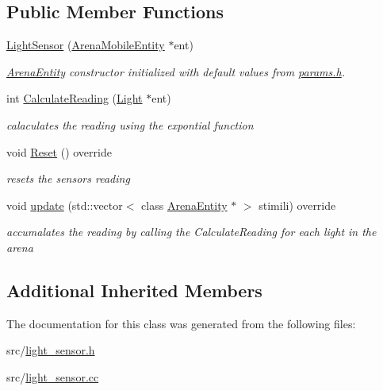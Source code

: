 \subsection*{Public Member Functions}
\begin{DoxyCompactItemize}
\item 
\hyperlink{class_light_sensor_ac99ce134fee5ee22775a8d5a6531d02b}{Light\+Sensor} (\hyperlink{class_arena_mobile_entity}{Arena\+Mobile\+Entity} $\ast$ent)\hypertarget{class_light_sensor_ac99ce134fee5ee22775a8d5a6531d02b}{}\label{class_light_sensor_ac99ce134fee5ee22775a8d5a6531d02b}

\begin{DoxyCompactList}\small\item\em \hyperlink{class_arena_entity}{Arena\+Entity} constructor initialized with default values from \hyperlink{params_8h}{params.\+h}. \end{DoxyCompactList}\item 
int \hyperlink{class_light_sensor_abcd9b14b4c09ed48d09eddd72943f898}{Calculate\+Reading} (\hyperlink{class_light}{Light} $\ast$ent)\hypertarget{class_light_sensor_abcd9b14b4c09ed48d09eddd72943f898}{}\label{class_light_sensor_abcd9b14b4c09ed48d09eddd72943f898}

\begin{DoxyCompactList}\small\item\em calaculates the reading using the expontial function \end{DoxyCompactList}\item 
void \hyperlink{class_light_sensor_a8b8643f10dc619dd8f31ab87034a04f6}{Reset} () override\hypertarget{class_light_sensor_a8b8643f10dc619dd8f31ab87034a04f6}{}\label{class_light_sensor_a8b8643f10dc619dd8f31ab87034a04f6}

\begin{DoxyCompactList}\small\item\em resets the sensors reading \end{DoxyCompactList}\item 
void \hyperlink{class_light_sensor_acf1befd5d67f95bebf3a12f9e3abe93a}{update} (std\+::vector$<$ class \hyperlink{class_arena_entity}{Arena\+Entity} $\ast$ $>$ stimili) override\hypertarget{class_light_sensor_acf1befd5d67f95bebf3a12f9e3abe93a}{}\label{class_light_sensor_acf1befd5d67f95bebf3a12f9e3abe93a}

\begin{DoxyCompactList}\small\item\em accumalates the reading by calling the Calculate\+Reading for each light in the arena \end{DoxyCompactList}\end{DoxyCompactItemize}
\subsection*{Additional Inherited Members}


The documentation for this class was generated from the following files\+:\begin{DoxyCompactItemize}
\item 
src/\hyperlink{light__sensor_8h}{light\+\_\+sensor.\+h}\item 
src/\hyperlink{light__sensor_8cc}{light\+\_\+sensor.\+cc}\end{DoxyCompactItemize}
